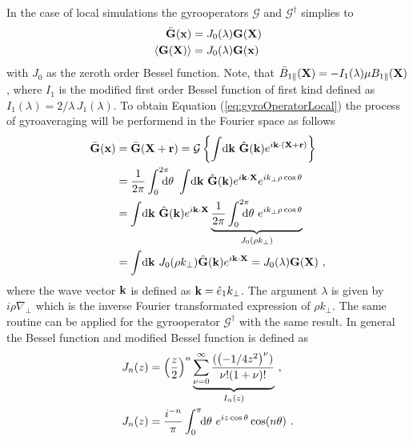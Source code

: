In the case of local simulations the gyrooperators $\mathcal{G}$ and $\mathcal{G}^\dagger$ simplies to
\begin{gather}
    \begin{aligned}
        \bar{\boldsymbol{\mathbf{G}}}(\boldsymbol{\mathbf{x}}) &= J_0(\lambda) \boldsymbol{\mathbf{G}}(\boldsymbol{\mathbf{X}}) \\
        \langle\boldsymbol{\mathbf{G}}(\boldsymbol{\mathbf{X}})\rangle &= J_0(\lambda) \boldsymbol{\mathbf{G}}(\boldsymbol{\mathbf{x}})
    \end{aligned}
    \label{eq:gyroOperatorLocal}
\end{gather}
with $J_0$ as the zeroth order Bessel function. Note, that $\bar{B}_{1\parallel}(\boldsymbol{\mathbf{X}}) = - I_1(\lambda)\mu B_{1\parallel} (\boldsymbol{\mathbf{X}})$, where $I_1$ is the modified first order Bessel function of first kind defined as $I_1(\lambda) = 2/\lambda \, J_1(\lambda)$. To obtain Equation (\ref{eq:gyroOperatorLocal}) the process of gyroaveraging will be performend in the Fourier space as follows
\begin{gather}
    \begin{aligned}
        \ga{\vect{G}}(\x) &= \ga{\vect{G}}(\X + \vect{r}) = \tga{\left\{\ints \mathrm{d}\vect{k} ~ \hat{\vect{G}}(\vect{k}) e^{i \vect{k} \cdot (\X + \vect{r})} \right\}} \\
                          &= \frac{1}{2\pi} \intss{0}{2\pi} \dtheta ~ \ints \mathrm{d}\vect{k} ~ \hat{\vect{G}}(\vect{k}) e^{i \vect{k} \cdot \X} e^{ i k_\perp \rho \cos \theta} \\
                          &= \ints \mathrm{d}\vect{k} ~ \hat{\vect{G}}(\vect{k}) e^{i \vect{k} \cdot \X} \underbrace{\frac{1}{2\pi} \intss{0}{2\pi} \dtheta ~ e^{ i k_\perp \rho \cos \theta}}_{J_0(\rho k_\perp)}\\
                          &= \ints \mathrm{d}\vect{k} ~ J_0(\rho k_\perp) \hat{\vect{G}}(\vect{k}) e^{i \vect{k} \cdot \X} = J_0(\lambda) \vect{G}(\X)~,
    \end{aligned}
    \label{eq:gyroOperatorLocalDerivation}
\end{gather}
where the wave vector $\boldsymbol{\mathbf{k}}$ is defined as $\boldsymbol{\mathbf{k}} = \hat{e}_1 k_\perp$. The argument $\lambda$ is given by $i \rho \nabla_{\!\perp}$ which is the inverse Fourier transformated expression of $\rho k_\perp$. The same routine can be applied for the gyrooperator $\mathcal{G}^\dagger$ with the same result. In general the Bessel function and modified Bessel function is defined as \cite{Dannert_PHD}
\begin{gather}
    \begin{aligned}
        J_n(z) &= \left(\frac{z}{2}\right)^n \underbrace{\sum^{\infty}_{\nu = 0} \frac{(\left(- 1/4 z^2\right)^\nu)}{\nu! (1 + \nu) !}}_{I_n(z)}~, \\
        J_n(z) &= \frac{i^{-n}}{\pi} \int_{0}^{\pi}\!\!\mathrm{d}\theta ~ e^{i z \cos \theta} \cos (n\theta)~.
    \end{aligned}
    \label{eq:Besselfunction}
\end{gather}

